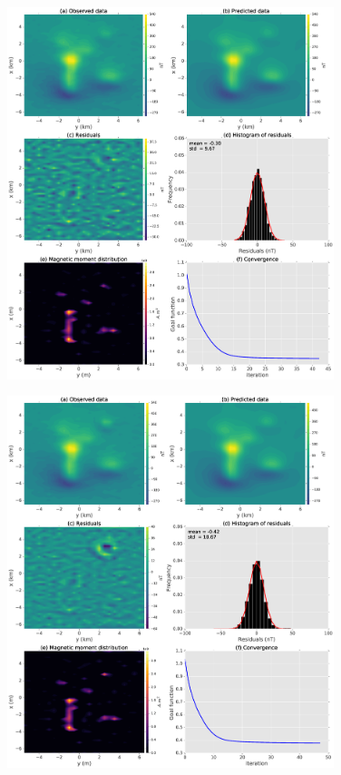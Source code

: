 
\begin{figure}
	\centering
	\includegraphics[width=0.85\textwidth]{Fig/unidir_test/results_compiled_LM_NNLS_magRM.eps}
	\caption{}
	\label{fig:unidir_test}
\end{figure}

\begin{figure}
	\centering
	\includegraphics[width=0.85\textwidth]{Fig/unidir_shallow_test/results_compiled_LM_NNLS_magRM.eps}
	\caption{}
	\label{fig:unidir_shallow_test}
\end{figure}

